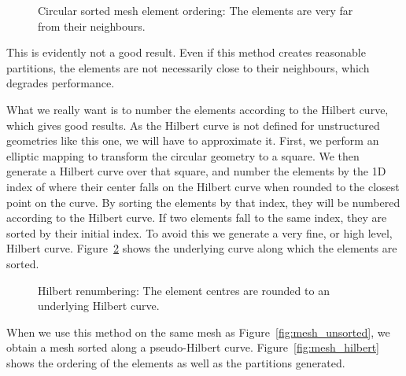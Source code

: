 \begin{figure}[H]
    \centering
    
    \caption{Circular sorted mesh element ordering: The elements are very far from their neighbours.}\label{fig:mesh_circular_ordering}
\end{figure}

This is evidently not a good result. Even if this method creates reasonable partitions, the elements
are not necessarily close to their neighbours, which degrades performance.

What we really want is to number the elements according to the Hilbert curve, which gives good
results. As the Hilbert curve is not defined for unstructured geometries like this one, we will have
to approximate it. First, we perform an elliptic mapping to transform the circular geometry to a
square. We then generate a Hilbert curve over that square, and number the elements by the 1D index
of where their center falls on the Hilbert curve when rounded to the closest point on the curve. By
sorting the elements by that index, they will be numbered according to the Hilbert curve. If two
elements fall to the same index, they are sorted by their initial index. To avoid this we generate a
very fine, or high level, Hilbert curve. Figure~\ref{fig:hilbert_renumbering} shows the underlying
curve along which the elements are sorted.

\begin{figure}[H]
    \centering
    
    \caption{Hilbert renumbering: The element centres are rounded to an underlying Hilbert curve.}\label{fig:hilbert_renumbering}
\end{figure}

When we use this method on the same mesh as Figure~\ref{fig:mesh_unsorted}, we obtain a mesh sorted
along a pseudo-Hilbert curve. Figure~\ref{fig:mesh_hilbert} shows the ordering of the elements as
well as the partitions generated.

